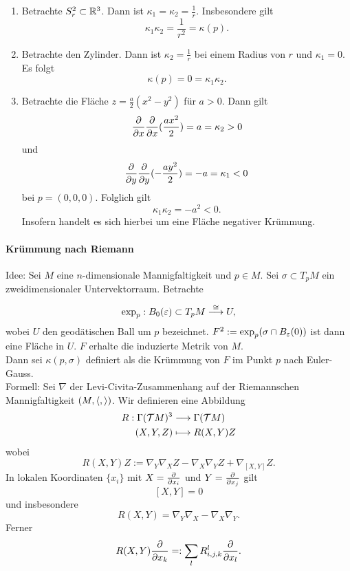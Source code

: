 \Bsp{}
\begin{enumerate}[1)]
	\item Betrachte $S^2_r \subset \mathbb{R}^3$. Dann ist $\kappa_1 = \kappa_2 = \frac{1}{r}$. Insbesondere gilt
	\[ \kappa_1 \kappa_2 = \frac{1}{r^2} = \kappa(p). \]
	\item Betrachte den Zylinder. Dann ist $\kappa_2 = \frac{1}{r}$ bei einem Radius von $r$ und $\kappa_1 = 0$. Es folgt
	\[ \kappa(p) = 0 = \kappa_1 \kappa_2. \]
	\item Betrachte die Fläche $z = \frac{a}{2}(x^2 - y^2)$ für $a > 0$. Dann gilt
	\[ \frac{\partial }{\partial x} \frac{\partial }{\partial x}(\frac{ax^2}{2}) = a = \kappa_2 > 0 \]
	und
	\[ \frac{\partial }{\partial y} \frac{\partial }{\partial y}(-\frac{ay^2}{2}) = -a = \kappa_1 < 0 \]
	bei $p= (0,0,0)$. Folglich gilt
	\[ \kappa_1 \kappa_2 = -a^2 < 0. \]
	Insofern handelt es sich hierbei um eine Fläche negativer Krümmung.
\end{enumerate}

\paragraph{Krümmung nach Riemann}
Idee: Sei $M$ eine $n$-dimensionale Mannigfaltigkeit und $p \in M$. Sei $\sigma \subset T_pM$ ein zweidimensionaler Untervektorraum. Betrachte
\begin{align*}
\exp_p : B_0(\varepsilon) \subset T_pM \overset{\overset{}{\cong}}{\longrightarrow} U,
\end{align*}
wobei $U$ den geodätischen Ball um $p$ bezeichnet. $F^2 := \exp_p(\sigma \cap B_\varepsilon(0))$ ist dann eine Fläche in $U$. $F$ erhalte die induzierte Metrik von $M$.\\
Dann sei $\kappa(p, \sigma)$ definiert als die Krümmung von $F$ im Punkt $p$ nach Euler-Gauss.\\
Formell: Sei $\nabla$ der Levi-Civita-Zusammenhang auf der Riemannschen Mannigfaltigkeit $(M, \left<,\right>)$. Wir definieren eine Abbildung
\begin{align*}
R : \Gamma(\mathcal{T} M )^3 & \overset{}{\longrightarrow} \Gamma(\mathcal{T} M)\\
(X,Y,Z) & \longmapsto R(X,Y)Z
\end{align*}
wobei
\[ R(X,Y) Z := \nabla_{Y} \nabla_{X} Z - \nabla_X \nabla_{Y} Z + \nabla_{[X,Y]}Z. \]
In lokalen Koordinaten $\{x_i\}$ mit $X = \frac{\partial }{\partial x_i}$ und $Y = \frac{\partial }{\partial x_j}$ gilt
\[ [X,Y] = 0 \]
und insbesondere
\[ R(X,Y) = \nabla_{Y}\nabla_{X} - \nabla_{X} \nabla_{Y}. \]
Ferner
\[ R(X,Y) \frac{\partial }{\partial x_k} =: \sum_l R^l_{i,j,k} \frac{\partial }{\partial x_l}. \]

